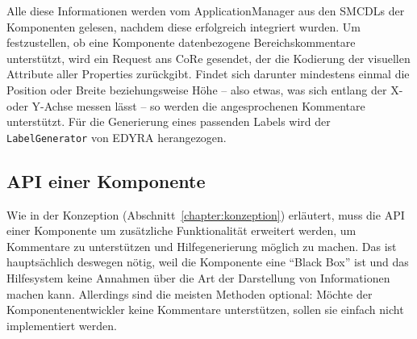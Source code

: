 \documentclass[
	headsepline,
	footsepline,
	fontsize=12pt,
	bibliography=totoc
]{scrbook}
\begin{document}
Alle diese Informationen werden vom ApplicationManager aus den SMCDLs der Komponenten gelesen, nachdem diese erfolgreich integriert wurden. Um festzustellen, ob eine Komponente datenbezogene Bereichskommentare unterstützt, wird ein Request ans CoRe gesendet, der die Kodierung der visuellen Attribute aller Properties zurückgibt. Findet sich darunter mindestens einmal die Position oder Breite beziehungsweise Höhe -- also etwas, was sich entlang der X- oder Y-Achse messen lässt -- so werden die angesprochenen Kommentare unterstützt. Für die Generierung eines passenden Labels wird der \texttt{LabelGenerator} von EDYRA herangezogen.


\subsection{API einer Komponente}
\label{section:implementierung:frontend:api}

Wie in der Konzeption (Abschnitt~\ref{chapter:konzeption}) erläutert, muss die API einer Komponente um zusätzliche Funktionalität erweitert werden, um Kommentare zu unterstützen und Hilfegenerierung möglich zu machen. Das ist hauptsächlich deswegen nötig, weil die Komponente eine \enquote{Black Box} ist und das Hilfesystem keine Annahmen über die Art der Darstellung von Informationen machen kann. Allerdings sind die meisten Methoden optional: Möchte der Komponentenentwickler keine Kommentare unterstützen, sollen sie einfach nicht implementiert werden.
\end{document}
